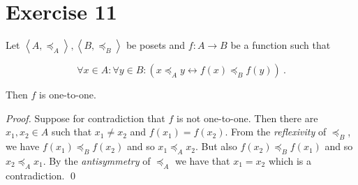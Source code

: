 \documentclass[11pt]{llncs}
\begin{document}
\section*{Exercise 11}
\begin{lemma}
  Let $\left<A, \preccurlyeq_A\right>, \left<B, \preccurlyeq_B\right>$ be posets
  and $f: A \longrightarrow B$ be a function such that

  \[
  \forall x \in A: \forall y \in B:
  (x \preccurlyeq_A y \leftrightarrow f(x) \preccurlyeq_B f(y))
  ~.
  \]

  Then $f$ is one-to-one.
\end{lemma}
\begin{proof}
  Suppose for contradiction that $f$ is not one-to-one. Then there are
  $x_1, x_2 \in A$ such that $x_1 \neq x_2$ and $f(x_1) = f(x_2)$. From the
  \emph{reflexivity} of $\preccurlyeq_B$, we have $f(x_1) \preccurlyeq_B
  f(x_2)$ and so $x_1 \preccurlyeq_A x_2$. But also $f(x_2) \preccurlyeq_B
  f(x_1)$ and so $x_2 \preccurlyeq_A x_1$. By the \emph{antisymmetry} of
  $\preccurlyeq_A$ we have that $x_1 = x_2$ which is a contradiction.
  \qed
\end{proof}
\end{document}

